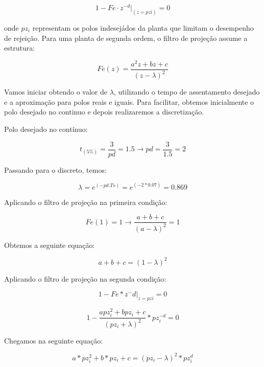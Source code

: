 \documentclass[a4paper,12pt]{article}
\begin{document}
\begin{equation}
1 - Fe \cdot z^{-d} |_{(z=pzi)} = 0 
\end{equation}

onde $pz_i$ representam os polos indesejádos da planta que limitam o desempenho de rejeição. Para uma planta de segunda ordem, o filtro de projeção assume a estrutura:

\begin{equation}
Fe(z) = \frac{a^2z+bz+c}{(z-\lambda)^2}
\end{equation}


Vamos iniciar obtendo o valor de \(\lambda\), utilizando o tempo de assentamento desejado e a aproximação para polos reais e iguais. Para facilitar, obtemos inicialmente o polo desejado  no continuo e depois realizaremos a discretização.


Polo desejado no contínuo:

\begin{equation}
t_{(5\%)} = \frac{3}{pd} = 1.5 \xrightarrow{} pd = \frac{3}{1.5} = 2
\end{equation}

Passando para o discreto, temos:

\begin{equation}
\lambda = e^{(-pd.Ts)} = e^{(-2*0.07)} = 0.869
\end{equation}

Aplicando o filtro de projeção na primeira condição:

\begin{equation}
Fe(1) = 1 → \frac{a+b+c}{(a-\lambda)^2} = 1
\end{equation}

Obtemos a seguinte equação:

\begin{equation}
a+b+c = (1-\lambda)^2
\end{equation}

Aplicando o filtro de projeção na segunda condição:

\begin{equation}
1-Fe * z ^-d |_{z=pzi} = 0
\end{equation}

\begin{equation}
1-\frac{apz^2_i + bpz_i + c}{(pz_i + \lambda)^2} * pz^{-d}_i = 0
\end{equation}

Chegamos na seguinte equação:

\begin{equation}
a * pz^2_i + b*pz_i + c = (pz_i - \lambda)^2 * pz^d_i
\end{equation}
\end{document}
